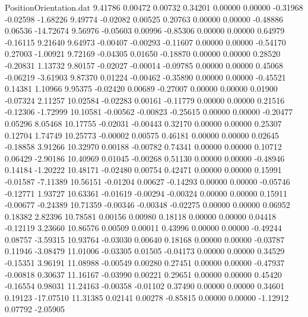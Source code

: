 \begin{filecontents}{PositionOrientation.dat}
   9.41786    0.00472    0.00732     0.34201    0.00000    0.00000   -0.31968   -0.02598   -1.68226
   9.49774   -0.02082    0.00525     0.20763    0.00000    0.00000   -0.48886    0.06536  -14.72674
   9.56976   -0.05603    0.00996    -0.85306    0.00000    0.00000    0.64979   -0.16115    9.21640
   9.64973   -0.00407   -0.00293    -0.11607    0.00000    0.00000   -0.54170    0.27003   -1.00921
   9.72169   -0.04305    0.01650    -0.18870    0.00000    0.00000    0.28520   -0.20831    1.13732
   9.80157   -0.02027   -0.00014    -0.09785    0.00000    0.00000    0.45068   -0.06219   -3.61903
   9.87370    0.01224   -0.00462    -0.35890    0.00000    0.00000   -0.45521    0.14381    1.10966
   9.95375   -0.02420    0.00689    -0.27007    0.00000    0.00000    0.01900   -0.07324    2.11257
  10.02584   -0.02283    0.00161    -0.11779    0.00000    0.00000    0.21516   -0.12306   -1.72999
  10.10581   -0.00562   -0.00823    -0.25615    0.00000    0.00000   -0.20477    0.05296    8.05468
  10.17755   -0.02031   -0.00443     0.32170    0.00000    0.00000    0.25307    0.12704    1.74749
  10.25773   -0.00002    0.00575     0.46181    0.00000    0.00000    0.02645   -0.18858    3.91266
  10.32970    0.00188   -0.00782     0.74341    0.00000    0.00000    0.10712    0.06429   -2.90186
  10.40969    0.01045   -0.00268     0.51130    0.00000    0.00000   -0.48946    0.14184   -1.20222
  10.48171   -0.02480    0.00754     0.42471    0.00000    0.00000    0.15991   -0.01587   -7.11389
  10.56151   -0.01204    0.00627    -0.14293    0.00000    0.00000   -0.05746   -0.12771    1.93727
  10.63361   -0.01619   -0.00294    -0.00324    0.00000    0.00000    0.15911   -0.00677   -0.24389
  10.71359   -0.00346   -0.00348    -0.02275    0.00000    0.00000    0.06952    0.18382    2.82396
  10.78581    0.00156    0.00980     0.18118    0.00000    0.00000    0.04418   -0.12119    3.23660
  10.86576    0.00509    0.00011     0.43996    0.00000    0.00000   -0.49244    0.08757   -3.59315
  10.93764   -0.03030    0.00640     0.18168    0.00000    0.00000   -0.03787    0.11946   -3.08479
  11.01006   -0.03305    0.01505    -0.04173    0.00000    0.00000    0.34529   -0.15351    3.96191
  11.08988   -0.00549    0.00280     0.27451    0.00000    0.00000   -0.47937   -0.00818    0.30637
  11.16167   -0.03990    0.00221     0.29651    0.00000    0.00000    0.45420   -0.16554    0.98031
  11.24163   -0.00358   -0.01102     0.37490    0.00000    0.00000    0.34601    0.19123  -17.07510
  11.31385    0.02141    0.00278    -0.85815    0.00000    0.00000   -1.12912    0.07792   -2.05905

\end{filecontents}
